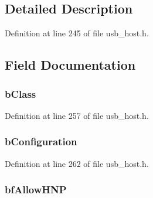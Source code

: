 \subsection{Detailed Description}


Definition at line 245 of file usb\+\_\+host.\+h.



\subsection{Field Documentation}
\hypertarget{struct___u_s_b___t_p_l_aad6f5bf23dbceea9fcd706a893c2e91e}{}
\subsubsection[{b\+Class}]{ b\+Class}\label{struct___u_s_b___t_p_l_aad6f5bf23dbceea9fcd706a893c2e91e}


Definition at line 257 of file usb\+\_\+host.\+h.

\hypertarget{struct___u_s_b___t_p_l_aceaf78f6ece640a53a4a71a663d2fa96}{}
\subsubsection[{b\+Configuration}]{ b\+Configuration}\label{struct___u_s_b___t_p_l_aceaf78f6ece640a53a4a71a663d2fa96}


Definition at line 262 of file usb\+\_\+host.\+h.

\hypertarget{struct___u_s_b___t_p_l_ab06942cd55103371c9a12df3434ad20c}{}
\subsubsection[{bf\+Allow\+H\+N\+P}]{ bf\+Allow\+H\+N\+P}\label{struct___u_s_b___t_p_l_ab06942cd55103371c9a12df3434ad20c}


